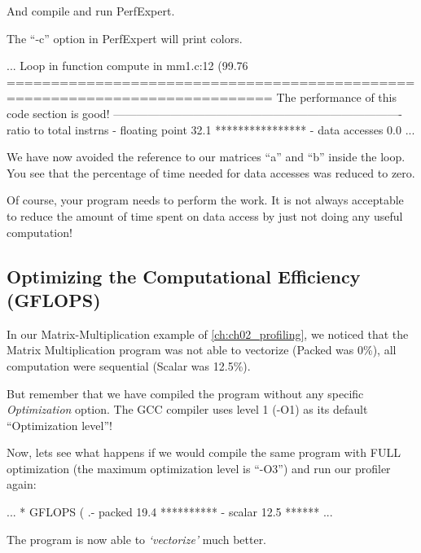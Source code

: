 And compile and run PerfExpert.

The ``-c'' option in PerfExpert will print colors.

\begin{prompt}
...
Loop in function compute in mm1.c:12 (99.76%
============================================================================
The performance of this code section is good!
----------------------------------------------------------------------------
ratio to total instrns    %
 - floating point       32.1 ****************
 - data accesses         0.0
...
\end{prompt}

We have now avoided the reference to our matrices ``a'' and ``b'' inside the loop. You see that the percentage of time needed for data accesses was reduced to zero.

 Of course, your program needs to perform the work. It is not always acceptable to reduce the amount of time spent on data access by just not doing any useful computation!

\subsection{Optimizing the Computational Efficiency (GFLOPS)}
\label{subsec:Optimizing_Computational_Efficiancy}

In our Matrix-Multiplication example of \autoref{ch:ch02_profiling}, we noticed that the Matrix Multiplication program was not able to vectorize (Packed was 0\%), all computation were sequential (Scalar was 12.5\%).

But remember that we have compiled the program without any specific \textit{Optimization} option. The GCC compiler uses level 1 (-O1) as its default ``Optimization level''!

Now, lets see what happens if we would compile the same program with FULL optimization (the maximum optimization level is ``-O3'') and run our profiler again:

\begin{prompt}
...
* GFLOPS (%
.- packed               19.4 **********
 - scalar               12.5 ******
...
\end{prompt}

The program is now able to \textit{`vectorize'} much better.

